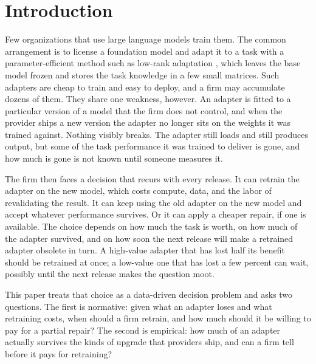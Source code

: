 \documentclass[ijds,nonblindrev]{informs4}
\begin{document}
\section{Introduction}\label{sec:intro}

Few organizations that use large language models train them. The common arrangement is to license a foundation model and adapt it to a task with a parameter-efficient method such as low-rank adaptation \citep[LoRA;][]{hu2022lora}, which leaves the base model frozen and stores the task knowledge in a few small matrices. Such adapters are cheap to train and easy to deploy, and a firm may accumulate dozens of them. They share one weakness, however. An adapter is fitted to a particular version of a model that the firm does not control, and when the provider ships a new version the adapter no longer sits on the weights it was trained against. Nothing visibly breaks. The adapter still loads and still produces output, but some of the task performance it was trained to deliver is gone, and how much is gone is not known until someone measures it.

The firm then faces a decision that recurs with every release. It can retrain the adapter on the new model, which costs compute, data, and the labor of revalidating the result. It can keep using the old adapter on the new model and accept whatever performance survives. Or it can apply a cheaper repair, if one is available. The choice depends on how much the task is worth, on how much of the adapter survived, and on how soon the next release will make a retrained adapter obsolete in turn. A high-value adapter that has lost half its benefit should be retrained at once; a low-value one that has lost a few percent can wait, possibly until the next release makes the question moot.

This paper treats that choice as a data-driven decision problem and asks two questions. The first is normative: given what an adapter loses and what retraining costs, when should a firm retrain, and how much should it be willing to pay for a partial repair? The second is empirical: how much of an adapter actually survives the kinds of upgrade that providers ship, and can a firm tell before it pays for retraining?
\end{document}
